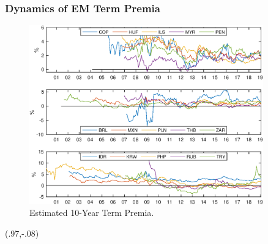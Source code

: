\documentclass[12pt, aspectratio=169, xcolor=dvipsnames]{beamer} 			         %
\begin{document}
\begin{frame}[label=tp_10yrA]
	\frametitle{Dynamics of EM Term Premia}
	\begin{figure}[!htbp]
		\begin{center}
			\includegraphics[trim={0 8.95cm 0 0}, clip, width=0.9\textwidth, height=0.65\textheight]{../Figures/Temp/temp_tp10yrEM}
			\par\end{center}
		\caption{Estimated 10-Year Term Premia.}\label{fig:tp_10yrA}
	\end{figure}
	\begin{textblock*}{3cm}(.97\textwidth,-.08\textheight)
		\hyperlink{tp_10yrB}{}
	\end{textblock*}
\end{frame}
\end{document}

